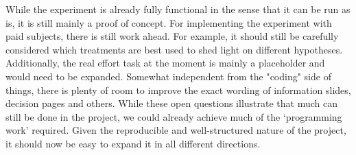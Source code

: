 \documentclass[11pt, a4paper, leqno]{article}
\begin{document}
While the experiment is already fully functional in the sense that it can be run as is, it is still mainly a proof of concept. For implementing the experiment with paid subjects, there is still work ahead. For example, it should still be carefully considered which treatments are best used to shed light on different hypotheses. Additionally, the real effort task at the moment is mainly a placeholder and would need to be expanded. Somewhat independent from the "coding" side of things, there is plenty of room to improve the exact wording of information slides, decision pages and others. While these open questions illustrate that much can still be done in the project, we could already achieve much of the `programming work' required. Given the reproducible and well-structured nature of the project, it should now be easy to expand it in all different directions.








\end{document}
